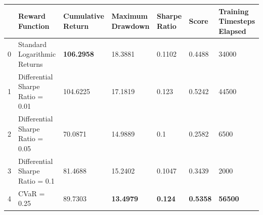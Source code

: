 \begin{tabular}{lllllll}
\toprule
 & Reward Function & Cumulative Return & Maximum Drawdown & Sharpe Ratio & Score & Training Timesteps Elapsed \\
\midrule
0 & Standard Logarithmic Returns & \textbf{106.2958} & 18.3881 & 0.1102 & 0.4488 & 34000 \\
1 & Differential Sharpe Ratio = 0.01 & 104.6225 & 17.1819 & 0.123 & 0.5242 & 44500 \\
2 & Differential Sharpe Ratio = 0.05 & 70.0871 & 14.9889 & 0.1 & 0.2582 & 6500 \\
3 & Differential Sharpe Ratio = 0.1 & 81.4688 & 15.2402 & 0.1047 & 0.3439 & 2000 \\
4 & CVaR = 0.25 & 89.7303 & \textbf{13.4979} & \textbf{0.124} & \textbf{0.5358} & \textbf{56500} \\
\bottomrule
\end{tabular}

